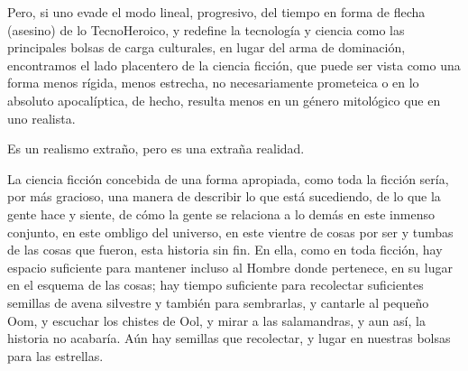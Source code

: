 Pero, si uno evade el modo lineal, progresivo, del
tiempo en forma de flecha (asesino) de lo TecnoHeroico, y
redefine la tecnología y ciencia como
las principales bolsas de carga culturales, en lugar
del arma de dominación, encontramos el lado
placentero de la ciencia ficción, que puede ser
vista como una forma menos rígida, menos estrecha, 
no necesariamente prometeica o en lo
absoluto apocalíptica, de hecho, resulta menos
en un género mitológico que en uno realista.

Es un realismo extraño, pero es una extraña
realidad.

La ciencia ficción concebida de una forma
apropiada, como toda la ficción sería, por más
gracioso, una manera de describir lo que está
sucediendo, de lo que la gente hace y siente, de
cómo la gente se relaciona a lo demás en este
inmenso conjunto, en este ombligo del universo,
en este vientre de cosas por ser y tumbas de las
cosas que fueron, esta historia sin fin. En ella,
como en toda ficción, hay espacio suficiente para
mantener incluso al Hombre donde pertenece,
en su lugar en el esquema de las cosas; hay
tiempo suficiente para recolectar suficientes
semillas de avena silvestre y también para
sembrarlas, y cantarle al pequeño Oom, y
escuchar los chistes de Ool, y mirar a las
salamandras, y aun así, la historia no acabaría.
Aún hay semillas que recolectar, y lugar en
nuestras bolsas para las estrellas.